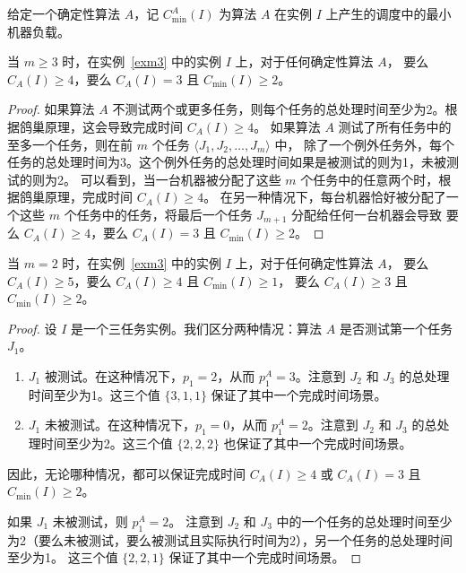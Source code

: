 给定一个确定性算法 \( A \)，记 \( C^A_{\min}(I) \) 为算法 \( A \) 在实例 \( I \) 上产生的调度中的最小机器负载。

\begin{lem}
    \label{lem6}
    当 \( m \geq 3 \) 时，在实例~\ref{exm3} 中的实例 \( I \) 上，对于任何确定性算法 \( A \)，
    要么 \( C_A(I) \geq 4 \)，要么 \( C_A(I) = 3 \) 且 \( C_{\min}(I) \geq 2 \)。
\end{lem}

\begin{proof}
    如果算法 \( A \) 不测试两个或更多任务，则每个任务的总处理时间至少为2。根据鸽巢原理，这会导致完成时间 \( C_A(I) \geq 4 \)。
    如果算法 \( A \) 测试了所有任务中的至多一个任务，则在前 \( m \) 个任务 \( \langle J_1, J_2, \ldots, J_m \rangle \) 中，
    除了一个例外任务外，每个任务的总处理时间为3。这个例外任务的总处理时间如果是被测试的则为1，未被测试的则为2。
    可以看到，当一台机器被分配了这些 \( m \) 个任务中的任意两个时，根据鸽巢原理，完成时间 \( C_A(I) \geq 4 \)。
    在另一种情况下，每台机器恰好被分配了一个这些 \( m \) 个任务中的任务，将最后一个任务 \( J_{m+1} \) 分配给任何一台机器会导致
    要么 \( C_A(I) \geq 4 \)，要么 \( C_A(I) = 3 \) 且 \( C_{\min}(I) \geq 2 \)。
\end{proof}

\begin{lem}
    \label{lem7}
    当 \( m = 2 \) 时，在实例~\ref{exm3} 中的实例 \( I \) 上，对于任何确定性算法 \( A \)，
    要么 \( C_A(I) \geq 5 \)，要么 \( C_A(I) \geq 4 \) 且 \( C_{\min}(I) \geq 1 \)，
    要么 \( C_A(I) \geq 3 \) 且 \( C_{\min}(I) \geq 2 \)。
\end{lem}

\begin{proof}
    设 \( I \) 是一个三任务实例。我们区分两种情况：算法 \( A \) 是否测试第一个任务 \( J_1 \)。
    \begin{enumerate}
        \item \( J_1 \) 被测试。在这种情况下，\( p_1 = 2 \)，从而 \( p^A_1 = 3 \)。注意到 \( J_2 \) 和 \( J_3 \) 的总处理时间至少为1。这三个值 \(\{3, 1, 1\}\) 保证了其中一个完成时间场景。
        \item \( J_1 \) 未被测试。在这种情况下，\( p_1 = 0 \)，从而 \( p^A_1 = 2 \)。注意到 \( J_2 \) 和 \( J_3 \) 的总处理时间至少为2。这三个值 \(\{2, 2, 2\}\) 也保证了其中一个完成时间场景。
    \end{enumerate}
    因此，无论哪种情况，都可以保证完成时间 \( C_A(I) \geq 4 \) 或 \( C_A(I) = 3 \) 且 \( C_{\min}(I) \geq 2 \)。

    如果 \( J_1 \) 未被测试，则 \( p^A_1 = 2 \)。
    注意到 \( J_2 \) 和 \( J_3 \) 中的一个任务的总处理时间至少为2（要么未被测试，要么被测试且实际执行时间为2），另一个任务的总处理时间至少为1。
    这三个值 \(\{2, 2, 1\}\) 保证了其中一个完成时间场景。
\end{proof}

